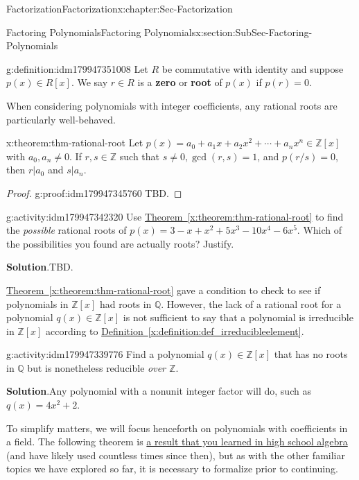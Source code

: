 \documentclass[oneside,10pt,]{book}
\newcommand{\blocktitlefont}{\relax}
\newcommand{\xreffont}{\relax}
\newcommand{\terminology}[1]{\textbf{#1}}
\numberwithin{equation}{section}
\def\Z{{\mathbb Z}}
\def\Q{{\mathbb Q}}
\begin{document}
\begin{chapterptx}{Factorization}{}{Factorization}{}{}{x:chapter:Sec-Factorization}
\begin{sectionptx}{Factoring Polynomials}{}{Factoring Polynomials}{}{}{x:section:SubSec-Factoring-Polynomials}
\begin{definition}{}{g:definition:idm179947351008}
Let \(R\) be commutative with identity and suppose \(p(x) \in R[x]\). We say \(r\in R\) is a \terminology{zero} or \terminology{root} of \(p(x)\) if \(p(r) = 0\).%
\end{definition}
When considering polynomials with integer coefficients, any rational roots are particularly well-behaved.%
\begin{theorem}{}{}{x:theorem:thm-rational-root}%
Let \(p(x) = a_0 + a_1 x + a_2 x^2 + \cdots + a_n x^n \in \Z[x]\) with \(a_0,a_n\ne 0\). If \(r,s\in\Z\) such that \(s\ne 0, \gcd(r,s)=1\), and \(p(r/s)=0\), then \(r|a_0\) and \(s|a_n\).%
\end{theorem}
\begin{proof}{}{g:proof:idm179947345760}
TBD.\end{proof}
\begin{activity}{}{g:activity:idm179947342320}%
Use \hyperref[x:theorem:thm-rational-root]{Theorem~{\xreffont\ref{x:theorem:thm-rational-root}}} to find the \emph{possible} rational roots of \(p(x) = 3 - x + x^2 + 5x^3 - 10x^4 - 6x^5\). Which of the possibilities you found are actually roots? Justify.%
\par\smallskip%
\noindent\textbf{\blocktitlefont Solution}.\hypertarget{g:solution:idm179947340368}{}\quad{}TBD.%
\end{activity}
\hyperref[x:theorem:thm-rational-root]{Theorem~{\xreffont\ref{x:theorem:thm-rational-root}}} gave a condition to check to see if polynomials in \(\Z[x]\) had roots in \(\Q\). However, the lack of a rational root for a polynomial \(q(x)\in \Z[x]\) is not sufficient to say that a polynomial is irreducible in \(\Z[x]\) according to \hyperref[x:definition:def_irreducibleelement]{Definition~{\xreffont\ref{x:definition:def_irreducibleelement}}}.%
\begin{activity}{}{g:activity:idm179947339776}%
Find a polynomial \(q(x) \in \Z[x]\) that has no roots in \(\Q\) but is nonetheless reducible \emph{over \(\Z\)}.%
\par\smallskip%
\noindent\textbf{\blocktitlefont Solution}.\hypertarget{g:solution:idm179947334544}{}\quad{}Any polynomial with a nonunit integer factor will do, such as \(q(x) = 4x^2 + 2\).%
\end{activity}
To simplify matters, we will focus henceforth on polynomials with coefficients in a field. The following theorem is \href{http://www.corestandards.org/Math/Content/HSA/APR/B/2/}{a result that you learned in high school algebra} (and have likely used countless times since then), but as with the other familiar topics we have explored so far, it is necessary to formalize prior to continuing.%

\end{sectionptx}
\end{chapterptx}
\end{document}
